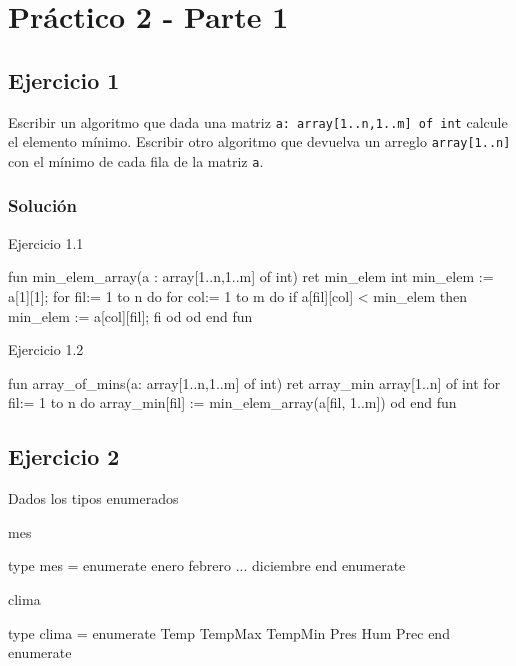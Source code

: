 \chapter{Práctico 2 - Parte 1}
\section{Ejercicio 1}
Escribir un algoritmo que dada una matriz \texttt{a: array[1..n,1..m] of int} calcule el elemento mínimo. Escribir otro algoritmo que devuelva un arreglo \texttt{array[1..n]} con el mínimo de cada fila de la matriz \texttt{a}.

\subsection{Solución}
\begin{codebox}{Ejercicio 1.1}
\begin{pascallike}
fun min_elem_array(a : array[1..n,1..m] of int) ret min_elem int
    min_elem := a[1][1];
    for fil:= 1 to n do
        for col:= 1 to m do
            if a[fil][col] < min_elem then
                min_elem := a[col][fil];
            fi
        od
    od
end fun
\end{pascallike}
\end{codebox}

\begin{codebox}{Ejercicio 1.2}
\begin{pascallike}
fun array_of_mins(a: array[1..n,1..m] of int) ret array_min array[1..n] of int
for fil:= 1 to n do
    array_min[fil] := min_elem_array(a[fil, 1..m])
od
end fun
\end{pascallike}
\end{codebox}


\section{Ejercicio 2}
Dados los tipos enumerados

\begin{codebox}{mes}
\begin{pascallike}
type mes = enumerate
            enero
            febrero
            ...
            diciembre
           end enumerate
\end{pascallike}
\end{codebox}

\begin{codebox}{clima}
\begin{pascallike}
type clima = enumerate
                Temp
                TempMax
                TempMin
                Pres
                Hum
                Prec
             end enumerate
\end{pascallike}
\end{codebox}

